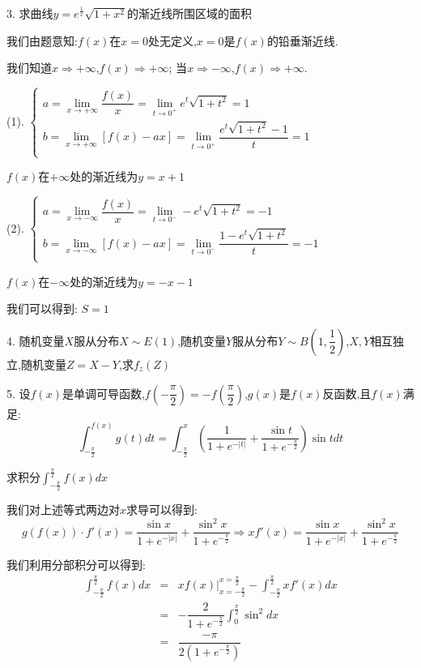 3. 求曲线$y=e^{\frac{1}{x}}\sqrt{1+x^2}$的渐近线所围区域的面积
\begin{solution}

	我们由题意知:$f(x)$在$x=0$处无定义,$x=0$是$f(x)$的铅垂渐近线.
	
	我们知道$x\Rightarrow +\infty$,$f(x)\Rightarrow +\infty$; 当$x\Rightarrow -\infty$,$f(x)\Rightarrow +\infty$.
	
	(1). $\left\lbrace
	\begin{array}{l}
		a=\lim\limits_{x\rightarrow+\infty}\dfrac{f(x)}{x}=\lim\limits_{t\rightarrow 0^{+}}e^{t}\sqrt{1+t^2}=1\\
		b=\lim\limits_{x\rightarrow+\infty}\left[ f(x)-ax\right]=\lim\limits_{t\rightarrow 0^{+}}\dfrac{e^{t}\sqrt{1+t^2}-1}{t}=1\\
	\end{array}
	\right. $
	
	$f(x)$在$+\infty$处的渐近线为$y=x+1$
	
	(2). $\left\lbrace
	\begin{array}{l}
		a=\lim\limits_{x\rightarrow-\infty}\dfrac{f(x)}{x}=\lim\limits_{t\rightarrow 0^{-}}-e^{t}\sqrt{1+t^2}=-1\\
		b=\lim\limits_{x\rightarrow-\infty}\left[ f(x)-ax\right]=\lim\limits_{t\rightarrow 0^{-}}\dfrac{1-e^{t}\sqrt{1+t^2}}{t}=-1\\
	\end{array}
	\right. $
	
	$f(x)$在$-\infty$处的渐近线为$y=-x-1$
	
	我们可以得到:  $S=1$
\end{solution}

4. 随机变量$X$服从分布$X\sim E(1)$,随机变量$Y$服从分布$Y\sim B(1,\dfrac{1}{2})$,$X,Y$相互独立,随机变量$Z=X-Y$,求$f_{z}(Z)$
\begin{solution}
	
\end{solution}

5. 设$f(x)$是单调可导函数,$f(-\dfrac{\pi}{2})=-f(\dfrac{\pi}{2})$,$g(x)$是$f(x)$反函数,且$f(x)$满足:
$$\int_{-\frac{\pi}{2}}^{f(x)}g(t)dt=\int_{-\frac{\pi}{2}}^{x}\left(\dfrac{1}{1+e^{-|t|}}+\dfrac{\sin t}{1+e^{-\frac{\pi}{2}}}\right)\sin tdt$$

求积分$\int_{-\frac{\pi}{2}}^{\frac{\pi}{2}}f(x)dx$
\begin{solution}

	我们对上述等式两边对$x$求导可以得到:  
	$$g(f(x))\cdot f'(x)=\dfrac{\sin x}{1+e^{-|x|}}+\dfrac{\sin^2 x}{1+e^{-\frac{\pi}{2}}}\Rightarrow xf'(x)=\dfrac{\sin x}{1+e^{-|x|}}+\dfrac{\sin^2 x}{1+e^{-\frac{\pi}{2}}}$$
	
	我们利用分部积分可以得到:  
	\begin{eqnarray*}
		\int_{-\frac{\pi}{2}}^{\frac{\pi}{2}}f(x)dx&=&xf(x)|_{x=-\frac{\pi}{2}}^{x=\frac{\pi}{2}}-\int_{-\frac{\pi}{2}}^{\frac{\pi}{2}}xf'(x)dx\\
		&=&-\dfrac{2}{1+e^{-\frac{\pi}{2}}}\int_{0}^{\frac{\pi}{2}}\sin^2 dx\\
		&=&\dfrac{-\pi}{2(1+e^{-\frac{\pi}{2}})}
	\end{eqnarray*}
\end{solution}

